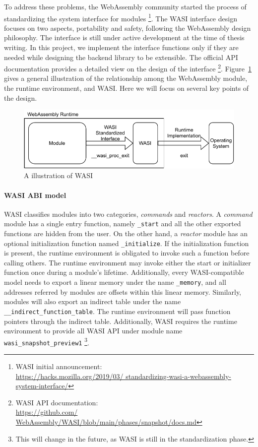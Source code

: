 To address these problems, the WebAssembly community started the process of
standardizing the system interface for modules
\footnote{WASI initial announcement: \\\url{https://hacks.mozilla.org/2019/03/
    standardizing-wasi-a-webassembly-system-interface/}}. The WASI interface
design focuses on two aspects, portability and safety, following the WebAssembly
design philosophy. The interface is still under active development at the time
of thesis writing. In this project, we implement the interface functions only
if they are needed while designing the backend library to be extensible. The
official API documentation provides a detailed view on the design of the
interface \footnote{WASI API documentation: \\\url{https://github.com/
    WebAssembly/WASI/blob/main/phases/snapshot/docs.md}}.
Figure~\ref{fig:wasi-intro} gives a general illustration of the relationship
among the WebAssembly module, the runtime environment, and WASI. Here we will
focus on several key points of the design.

\begin{figure}
  \centering
  \includegraphics{Images/wasi-intro.pdf}
  \caption{A illustration of WASI}
  \label{fig:wasi-intro}
\end{figure}

\paragraph{WASI ABI model}
WASI classifies modules into two categories, \emph{commands} and
\emph{reactors}. A \emph{command} module has a single entry function, namely
\texttt{\_start} and all the other exported functions are hidden from the user.
On the other hand, a \emph{reactor} module has an optional initialization
function named \texttt{\_initialize}. If the initialization function is
present, the runtime environment is obligated to invoke such a function before
calling others. The runtime environment may invoke either the start or
initializer function once during a module's lifetime. Additionally, every
WASI-compatible model needs to export a linear memory under the name
\texttt{\_memory}, and all addresses referred by modules are offsets within
this linear memory. Similarly, modules will also export an indirect table
under the name \texttt{\_\_indirect\_function\_table}. The runtime environment
will pass function pointers through the indirect table. Additionally, WASI
requires the runtime environment to provide all WASI API under module name
\texttt{wasi\_snapshot\_preview1} \footnote{This will change in the future, as
  WASI is still in the standardization phase.}.

